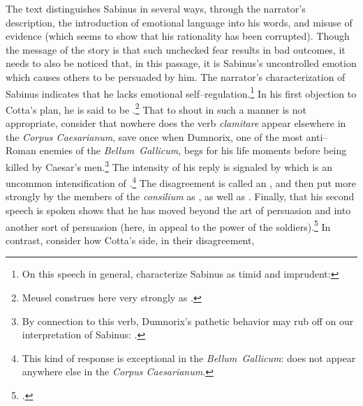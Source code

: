 \documentclass[12pt,letterpaper,oneside,final]{memoir}
\begin{document}
The text distinguishes Sabinus in several ways, through the narrator's description, the introduction of emotional language into his words, and misuse of evidence (which seems to show that his rationality has been corrupted). Though the message of the story is that such unchecked fear results in bad outcomes, it needs to also be noticed that, in this passage, it is Sabinus's uncontrolled emotion which causes others to be persuaded by him.
 The narrator's characterization of Sabinus indicates that he lacks emotional self--regulation.\footnote{On this speech in general, \textcite{kranerdittenbergermeusel1967} characterize Sabinus as timid and imprudent: } In his first objection to Cotta's plan, he is said to be .\footnote{Meusel construes  here very strongly as .} That to shout in such a manner is not appropriate, consider that nowhere does the verb \emph{clamitare} appear elsewhere in the \emph{Corpus Caesarianum}, save once when Dumnorix, one of the most anti--Roman enemies of the \emph{Bellum~Gallicum}, begs for his life moments before being killed by Caesar's men.\footnote{By connection to this verb, Dumnorix's pathetic behavior may rub off on our interpretation of Sabinus: .} The intensity of his reply is signaled by  which is an uncommon intensification of  \parencite{kranerdittenbergermeusel1967}.\footnote{This kind of response is exceptional in the \emph{Bellum~Gallicum}:  does not appear anywhere else in the \emph{Corpus Caesarianum}.} The disagreement is called an , and then put more strongly by the members of the \emph{consilium} as , as well as . Finally, that his second speech is spoken  shows that he has moved beyond the art of persuasion and into another sort of persuasion (here, in appeal to the power of the soldiers).\footnote{.} In contrast, consider how Cotta's side, in their disagreement, 
\end{document}
